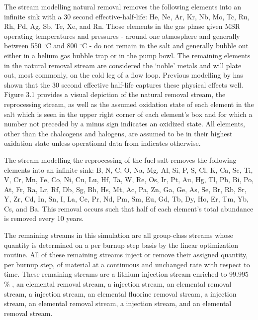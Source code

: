 The stream modelling natural removal removes the following elements into an 
infinite sink with a 30 second effective-half-life: He, Ne, Ar, Kr, Nb,
Mo, Tc, Ru, Rh, Pd, Ag, Sb, Te, Xe, and Rn. Those elements in the gas phase
given MSR operating temperatures and pressures - around one atmosphere and
generally between 550 $^{\circ}$C and 800 $^{\circ}$C - do not remain in
the salt and generally bubble out either in a helium gas bubble trap or in the
pump bowl. The remaining elements in the natural removal stream are considered
the `noble' metals and will plate out, most commonly, on the cold leg of a flow
loop. Previous modelling by \cite{Aufiero} has shown that the 30 second
effective half-life captures these physical effects well. Figure 
3.1 provides a visual depiction of the natural removal stream,
the reprocessing stream, as well as the assumed oxidation state of each element
in the salt which is seen in the upper right corner of each element's box and
for which a number not preceded by a minus sign indicates an oxidized state.
All elements, other than the chalcogens and halogens, are assumed to be in 
their highest oxidation state unless operational data from \cite{ORNL} 
indicates otherwise.

The stream modelling the reprocessing of the fuel salt removes the following
elements into an infinite sink: B, N, C, O, Na, Mg, Al, Si, P, S, Cl, K, Ca, Sc,
Ti, V, Cr, Mn, Fe, Co, Ni, Cu, Lu, Hf, Ta, W, Re, Os, Ir, Pt, Au, Hg, Tl, Pb,
Bi, Po, At, Fr, Ra, Lr, Rf, Db, Sg, Bh, Hs, Mt, Ac, Pa, Zn, Ga, Ge, As, Se, Br,
Rb, Sr, Y, Zr, Cd, In, Sn, I, La, Ce, Pr, Nd, Pm, Sm, Eu, Gd, Tb, Dy, Ho, Er,
Tm, Yb, Cs, and Ba. This removal occurs such that half of each element's total
abundance is removed every 10 years. 

The remaining streams in this simulation are all group-class streams whose
quantity is determined on a per burnup step basis by the linear optimization
routine. All of these remaining streams inject or remove their assigned 
quantity, per burnup step, of material at a continuous and unchanged rate 
with respect to time. These
remaining streams are a lithium injection stream enriched to 99.995 \% 
, an elemental  removal stream, a  injection
stream, an elemental  removal stream, a  injection stream, 
an elemental fluorine removal stream, a  injection stream, an
elemental  removal stream, a  injection stream, and an
elemental  removal stream.


